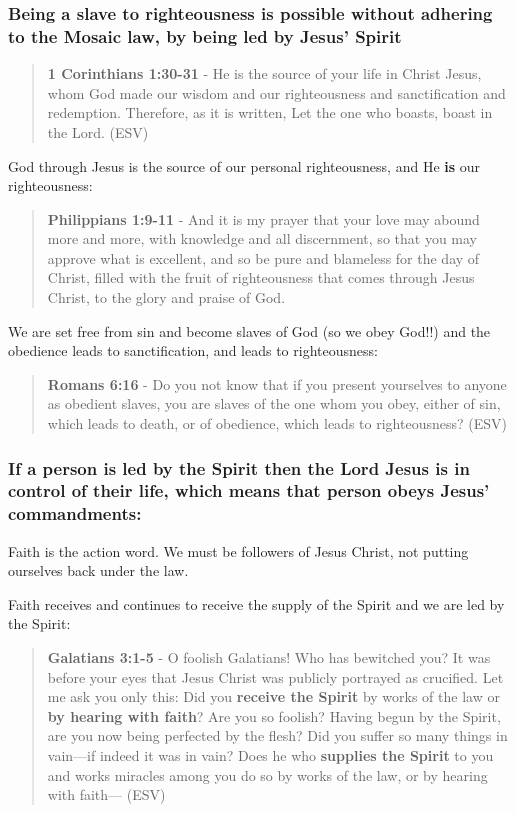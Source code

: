 \documentclass[11pt]{article}
\begin{document}
\subsubsection{Being a slave to righteousness is possible without adhering to the Mosaic law, by being led by Jesus' Spirit}
\label{sec:org5bb8958}

\begin{quote}
\textbf{1 Corinthians 1:30-31} -  He is the source of your life in Christ Jesus, whom God made our wisdom and our righteousness and sanctification and redemption.  Therefore, as it is written, Let the one who boasts, boast in the Lord.  (ESV)
\end{quote}

God through Jesus is the source of our personal righteousness, and He \textbf{is} our righteousness:

\begin{quote}
\textbf{Philippians 1:9-11} - And it is my prayer that your love may abound more and more, with knowledge and all discernment, so that you may approve what is excellent, and so be pure and blameless for the day of Christ, filled with the fruit of righteousness that comes through Jesus Christ, to the glory and praise of God.
\end{quote}

We are set free from sin and become slaves of God (so we obey God!!) and the obedience leads to sanctification, and leads to righteousness:

\begin{quote}
\textbf{Romans 6:16} - Do you not know that if you present yourselves to anyone as obedient slaves, you are slaves of the one whom you obey, either of sin, which leads to death, or of obedience, which leads to righteousness? (ESV)
\end{quote}

\subsubsection{If a person is led by the Spirit then the Lord Jesus is in control of their life, which means that person obeys Jesus' commandments:}
\label{sec:org6333e46}

Faith is the action word. We must be followers of Jesus Christ, not putting ourselves back under the law.

Faith receives and continues to receive the supply of the Spirit and we are led by the Spirit:

\begin{quote}
\textbf{Galatians 3:1-5} - O foolish Galatians! Who has bewitched you? It was before your eyes that Jesus Christ was publicly portrayed as crucified. Let me ask you only this: Did you \textbf{receive the Spirit} by works of the law or \textbf{by hearing with faith}? Are you so foolish? Having begun by the Spirit, are you now being perfected by the flesh? Did you suffer so many things in vain—if indeed it was in vain? Does he who \textbf{supplies the Spirit} to you and works miracles among you do so by works of the law, or by hearing with faith— (ESV)
\end{quote}
\end{document}
